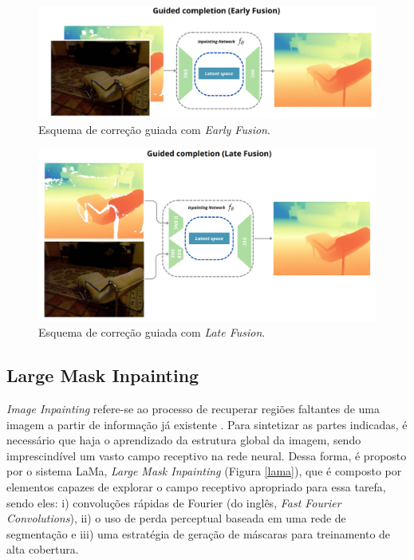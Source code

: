 \begin{figure}[h]
    \centering
    \includegraphics[width=\textwidth]{fig/earlyfusion.png}
    \caption{Esquema de correção guiada com \textit{Early Fusion}.}
    \label{early}
\end{figure}

\begin{figure}[h]
    \centering
    \includegraphics[width=\textwidth]{fig/latefusion.png}
    \caption{Esquema de correção guiada com \textit{Late Fusion}.}
    \label{late}
\end{figure}


\subsection{Large Mask Inpainting}


\textit{Image Inpainting} refere-se ao processo de recuperar regiões faltantes de uma imagem a partir de informação já existente \cite{elharrouss2020image}. Para sintetizar as partes indicadas, é necessário que haja o aprendizado da estrutura global da imagem, sendo imprescindível um vasto campo receptivo na rede neural. Dessa forma, é proposto por \cite{suvorov2022resolution} o sistema LaMa, \textit{Large Mask Inpainting} (Figura \ref{lama}), que é composto por elementos capazes de explorar o campo receptivo apropriado para essa tarefa, sendo eles: i) convoluções rápidas de Fourier (do inglês, \textit{Fast Fourier Convolutions}), ii) o uso de perda perceptual baseada em uma rede de segmentação e iii) uma estratégia de geração de máscaras para treinamento de alta cobertura.


